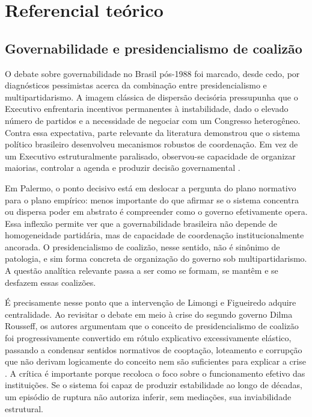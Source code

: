 \documentclass[12pt,a4paper]{article}
\begin{document}
\section{Referencial teórico}
\label{sec:org8e43760}
\subsection{Governabilidade e presidencialismo de coalizão}
\label{sec:org9b252a3}
O debate sobre governabilidade no Brasil pós-1988 foi marcado, desde cedo, por diagnósticos pessimistas acerca da combinação entre presidencialismo e multipartidarismo. A imagem clássica de dispersão decisória pressupunha que o Executivo enfrentaria incentivos permanentes à instabilidade, dado o elevado número de partidos e a necessidade de negociar com um Congresso heterogêneo. Contra essa expectativa, parte relevante da literatura demonstrou que o sistema político brasileiro desenvolveu mecanismos robustos de coordenação. Em vez de um Executivo estruturalmente paralisado, observou-se capacidade de organizar maiorias, controlar a agenda e produzir decisão governamental \textcite{palermo2000_como_se}.

Em Palermo, o ponto decisivo está em deslocar a pergunta do plano normativo para o plano empírico: menos importante do que afirmar se o sistema concentra ou dispersa poder em abstrato é compreender como o governo efetivamente opera. Essa inflexão permite ver que a governabilidade brasileira não depende de homogeneidade partidária, mas de capacidade de coordenação institucionalmente ancorada. O presidencialismo de coalizão, nesse sentido, não é sinônimo de patologia, e sim forma concreta de organização do governo sob multipartidarismo. A questão analítica relevante passa a ser como se formam, se mantêm e se desfazem essas coalizões.

É precisamente nesse ponto que a intervenção de Limongi e Figueiredo adquire centralidade. Ao revisitar o debate em meio à crise do segundo governo Dilma Rousseff, os autores argumentam que o conceito de presidencialismo de coalizão foi progressivamente convertido em rótulo explicativo excessivamente elástico, passando a condensar sentidos normativos de cooptação, loteamento e corrupção que não derivam logicamente do conceito nem são suficientes para explicar a crise \textcite{limongi2017_a_crise}. A crítica é importante porque recoloca o foco sobre o funcionamento efetivo das instituições. Se o sistema foi capaz de produzir estabilidade ao longo de décadas, um episódio de ruptura não autoriza inferir, sem mediações, sua inviabilidade estrutural.
\end{document}
